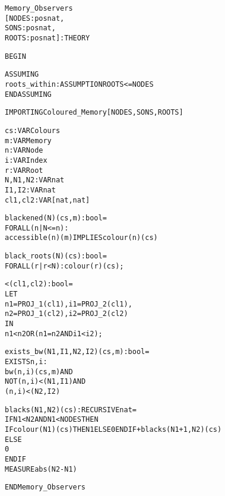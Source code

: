 \newpage
\begin{alltt}
%%%%%%%%%%%%%%%%%%%%%%%%%%%%%%%%%%%%%%%%%%%%%%%%%%%%%%%%%%%%
% Memory_Observers :                                       %
%   Defines memory observers, being functions that extract %
%   information from the memory. These functions are used  %
%   when stating the invariants.                           %
%%%%%%%%%%%%%%%%%%%%%%%%%%%%%%%%%%%%%%%%%%%%%%%%%%%%%%%%%%%%

Memory_Observers
  [NODES : posnat, 
   SONS  : posnat, 
   ROOTS : posnat] : THEORY

BEGIN

  ASSUMING
    roots_within : ASSUMPTION ROOTS <= NODES
  ENDASSUMING

  IMPORTING Coloured_Memory[NODES,SONS,ROOTS]

  cs      : VAR Colours
  m       : VAR Memory
  n       : VAR Node
  i       : VAR Index
  r       : VAR Root
  N,N1,N2 : VAR nat
  I1,I2   : VAR nat
  cl1,cl2 : VAR [nat,nat]

  blackened(N)(cs,m):bool =
    FORALL (n | N <= n):
      accessible(n)(m) IMPLIES colour(n)(cs)

  black_roots(N)(cs):bool =
    FORALL (r | r < N): colour(r)(cs);

  <(cl1,cl2):bool =
    LET 
      n1 = PROJ_1(cl1), i1 = PROJ_2(cl1), 
      n2 = PROJ_1(cl2), i2 = PROJ_2(cl2)
    IN
      n1 < n2 OR (n1 = n2 AND i1 < i2);

  exists_bw(N1,I1,N2,I2)(cs,m):bool =
    EXISTS n,i:
      bw(n,i)(cs,m) AND 
      NOT (n,i) < (N1,I1) AND
      (n,i) < (N2,I2)

  blacks(N1,N2)(cs) : RECURSIVE nat =
    IF N1 < N2 AND N1 < NODES THEN 
      IF colour(N1)(cs) THEN 1 ELSE 0 ENDIF + blacks(N1+1,N2)(cs)
    ELSE
      0
    ENDIF
    MEASURE abs(N2-N1)

END Memory_Observers
\end{alltt}

